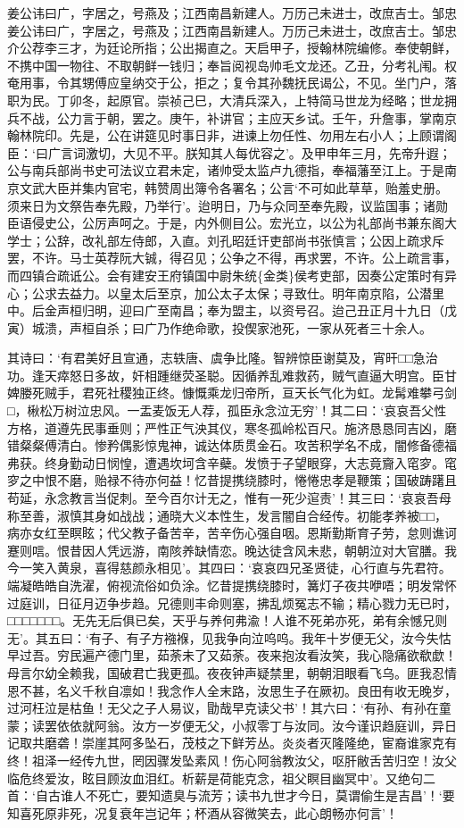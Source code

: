 \documentclass[]{article}
\begin{document}
姜公讳曰广，字居之，号燕及；江西南昌新建人。万历己未进士，改庶吉士。邹忠姜公讳曰广，字居之，号燕及；江西南昌新建人。万历己未进士，改庶吉士。邹忠介公荐李三才，为廷论所指；公出揭直之。天启甲子，授翰林院编修。奉使朝鲜，不携中国一物往、不取朝鲜一钱归；奉旨阅视岛帅毛文龙还。乙丑，分考礼闱。权奄用事，令其甥傅应皇纳交于公，拒之；复令其孙魏抚民谒公，不见。坐门户，落职为民。丁卯冬，起原官。崇祯己巳，大清兵深入，上特简马世龙为经略；世龙拥兵不战，公力言于朝，罢之。庚午，补讲官；主应天乡试。壬午，升詹事，掌南京翰林院印。先是，公在讲筵见时事日非，进谏上勿任性、勿用左右小人；上顾谓阁臣：`曰广言词激切，大见不平。朕知其人每优容之'。及甲申年三月，先帝升遐；公与南兵部尚书史可法议立君未定，诸帅受太监卢九德指，奉福藩至江上。于是南京文武大臣并集内官宅，韩赞周出簿令各署名；公言`不可如此草草，贻羞史册。须来日为文祭告奉先殿，乃举行'。迨明日，乃与众同至奉先殿，议监国事；诸勋臣语侵史公，公厉声呵之。于是，内外侧目公。宏光立，以公为礼部尚书兼东阁大学士；公辞，改礼部左侍郎，入直。刘孔昭廷讦吏部尚书张慎言；公因上疏求斥罢，不许。马士英荐阮大铖，得召见；公争之不得，再求罢，不许。公上疏言事，而四镇合疏诋公。会有建安王府镇国中尉朱统\{金类\}侯考吏部，因奏公定策时有异心；公求去益力。以皇太后至京，加公太子太保；寻致仕。明年南京陷，公潜里中。后金声桓归明，迎曰广至南昌；奉为盟主，以资号召。迨己丑正月十九日（戊寅）城溃，声桓自杀；曰广乃作绝命歌，投偰家池死，一家从死者三十余人。

其诗曰：`有君美好且宣通，志轶唐、虞争比隆。智辨惊臣谢莫及，宵旰□□急治功。逢天瘁怒日多故，奸相踵继荧圣聪。因循养乱难救药，贼气直逼大明宫。臣甘婢媵死贼手，君死社稷独正终。慷慨乘龙归帝所，亘天长气化为虹。龙髯难攀弓剑□，楸松万树泣忠风。一盂麦饭无人荐，孤臣永念泣无穷'！其二曰：`哀哀吾父性方格，道遵先民事垂则；严性正气泱其仪，寒冬孤岭松百尺。施济恳恳同吉凶，磨错粲粲傅清白。惨矜偶影惊鬼神，诚达体质贯金石。攻苦积学名不成，闇修备德福弗获。终身勤动日悯惶，遭遇坎坷含辛蘗。发愤于子望眼穿，大志竟齎入窀穸。窀穸之中恨不磨，贻禄不待亦何益！忆昔提携绕膝时，惓惓忠孝是鞭策；国破踌躇且苟延，永念教言当促刺。至今百尔计无之，惟有一死少逭责'！其三曰：`哀哀吾母称至善，淑慎其身如战战；通晓大义本性生，发言闇自合经传。初能孝养被□□，病亦女红至瞑眩；代父教子备苦辛，苦辛伤心强自咽。恩斯勤斯育子劳，怠则谯诃蹇则唁。恨昔因人凭远游，南陔养缺情恋。晚达徒含风未悲，朝朝泣对大官膳。我今一笑入黄泉，喜得慈颜永相见'。其四曰：`哀哀四兄圣贤徒，心行直与先君符。端凝皓皓自洗濯，俯视流俗如负涂。忆昔提携绕膝时，篝灯子夜共咿唔；明发常怀过庭训，日征月迈争步趋。兄德则丰命则塞，拂乱烦冤志不输；精心戮力无已时，□□□□□□□。无先无后俱已矣，天乎与养何弗渝！人谁不死弟亦死，弟有余憾兄则无'。其五曰：`有子、有子方襁褓，见我争向泣呜呜。我年十岁便无父，汝今失怙早过吾。穷民遍产德门里，茹荼未了又茹荼。夜来抱汝看汝笑，我心隐痛欲欷歔！母言尔幼全赖我，国破君亡我更孤。夜夜钟声疑禁里，朝朝泪眼看飞乌。匪我忍情恩不甚，名义千秋自凛如！我念作人全末路，汝思生子在厥初。良田有收无晚岁，过河枉泣是枯鱼！无父之子人易议，勖哉早克读父书'！其六曰：`有孙、有孙在童蒙；读罢依依就阿翁。汝方一岁便无父，小叔零丁与汝同。汝今谨识趋庭训，异日记取共磨砻！崇崖其阿多坠石，茂枝之下鲜芳丛。炎炎者灭隆隆绝，宦裔谁家克有终！祖泽一经传九世，罔因骤发坠素风！伤心阿翁教汝父，呕肝敝舌苦归空！汝父临危终爱汝，眩目顾汝血泪红。析薪是荷能克念，祖父瞑目幽冥中'。又绝句二首：`自古谁人不死亡，要知遗臭与流芳；读书九世才今日，莫谓偷生是吉昌'！`要知喜死原非死，况复衰年岂记年；杯酒从容微笑去，此心朗畅亦何言'！
\end{document}
